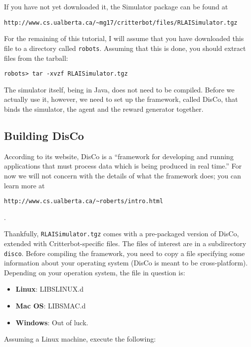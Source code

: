 \documentclass[12pt]{article}
\begin{document}
If you have not yet downloaded it, the Simulator package can be found at 

\begin{verbatim}
http://www.cs.ualberta.ca/~mg17/critterbot/files/RLAISimulator.tgz
\end{verbatim}

For the remaining of this tutorial, I will assume that you have downloaded
this file to a directory called \verb+robots+. Assuming that this is done, 
you should extract files from the tarball:

\begin{verbatim}robots> tar -xvzf RLAISimulator.tgz \end{verbatim}

The simulator itself, being in Java, does not need to be compiled. Before
we actually use it, however, we need to set up the framework, called DisCo,
that binds the simulator, the agent and the reward generator together.

\subsection{Building DisCo}

According to its website, DisCo is a ``framework for developing and running 
applications that must process data which is being produced in real time.'' 
For now we will not
concern with the details of what the framework does; you can learn more at
\begin{verbatim}http://www.cs.ualberta.ca/~roberts/intro.html\end{verbatim}.

Thankfully, \verb+RLAISimulator.tgz+ comes with a pre-packaged version of 
DisCo, extended with Critterbot-specific files. The files of interest are in
a subdirectory \verb+disco+. Before compiling the framework, you need to copy 
a file specifying some information about your operating system (DisCo is meant
to be cross-platform). Depending on your operation system, the file in 
question is:

\begin{itemize}
\item{\textbf{Linux}: LIBSLINUX.d}
\item{\textbf{Mac OS}: LIBSMAC.d}
\item{\textbf{Windows}: Out of luck.}
\end{itemize}

Assuming a Linux machine, execute the following:
\end{document}
